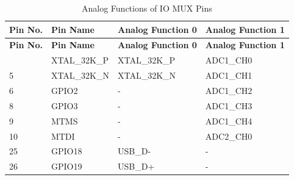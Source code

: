    \begin{longtable}[c]{|p{2cm}|p{2.5cm}|p{3cm}|p{3cm}| }
   \caption{Analog Functions of IO MUX Pins}
    \label{tab:iomuxgpio-iomax-pins-analog-functions} \\
        \hline
        \rowcolor{lightgray}
        \textbf{Pin No.} & \textbf{Pin Name} & \textbf{Analog Function 0} & \textbf{Analog Function 1} \\
        \hline
        \endfirsthead
        \hline
        \rowcolor{lightgray}
        \textbf{Pin No.} & \textbf{Pin Name} & \textbf{Analog Function 0} & \textbf{Analog Function 1} \\
        \hline
        \endhead
        \endfoot
 4 & XTAL\_32K\_P   & XTAL\_32K\_P & ADC1\_CH0                  \\
\hline
 5 & XTAL\_32K\_N   & XTAL\_32K\_N & ADC1\_CH1                 \\
\hline
 6 & GPIO2   & -            & ADC1\_CH2                 \\
\hline
 8 & GPIO3   & -            & ADC1\_CH3                 \\
\hline
9 & MTMS   & -            & ADC1\_CH4                  \\
\hline
10 & MTDI   & -            & ADC2\_CH0                  \\
\hline
25 & GPIO18   & USB\_D-      & -                          \\
\hline
26 & GPIO19   & USB\_D+      & -                          \\\hline


\end{longtable}

